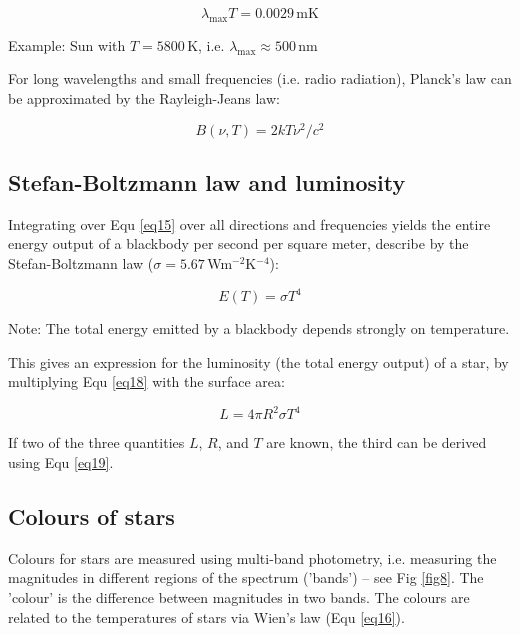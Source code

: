 \begin{equation}
\lambda_{\mathrm{max}} T = 0.0029\,\mathrm{m K}
\label{eq16}
\end{equation}

Example: Sun with $T = 5800$\,K, i.e. $\lambda_{\mathrm{max}} \approx 500$\,nm

For long wavelengths and small frequencies (i.e. radio radiation), Planck's law can be approximated by the Rayleigh-Jeans law:

\begin{equation}
B(\nu,T) = 2kT \nu^2 / c^2
\label{eq17}
\end{equation}

\subsection{Stefan-Boltzmann law and luminosity}

Integrating over Equ \eqref{eq15} over all directions and frequencies yields the entire energy output of a blackbody per second per square meter, describe by the Stefan-Boltzmann law ($\sigma = 5.67$\,Wm$^{-2}$K$^{-4}$):

\begin{equation}
E(T) = \sigma T^4
\label{eq18}
\end{equation}

Note: The total energy emitted by a blackbody depends strongly on temperature.

This gives an expression for the luminosity (the total energy output) of a star, by multiplying Equ \ref{eq18} with the surface area:

\begin{equation}
L = 4 \pi R^2 \sigma T^4
\label{eq19}
\end{equation}

If two of the three quantities $L$, $R$, and $T$ are known, the third can be derived using Equ \eqref{eq19}.

\subsection{Colours of stars}

Colours for stars are measured using multi-band photometry, i.e. measuring the magnitudes in different regions of the spectrum ('bands') -- see Fig \ref{fig8}. The 'colour' is the difference between magnitudes in two bands. The colours are related to the temperatures of stars via Wien's law (Equ \eqref{eq16}).

